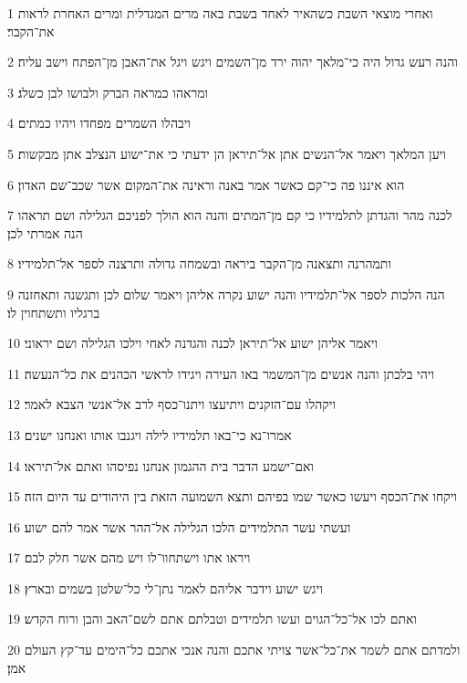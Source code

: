 \par 1 ואחרי מוצאי השבת כשהאיר לאחד בשבת באה מרים המגדלית ומרים האחרת לראות את־הקבר׃
\par 2 והנה רעש גדול היה כי־מלאך יהוה ירד מן־השמים ויגש ויגל את־האבן מן־הפתח וישב עליה׃
\par 3 ומראהו כמראה הברק ולבושו לבן כשלג׃
\par 4 ויבהלו השמרים מפחדו ויהיו כמתים׃
\par 5 ויען המלאך ויאמר אל־הנשים אתן אל־תיראן הן ידעתי כי את־ישוע הנצלב אתן מבקשות׃
\par 6 הוא איננו פה כי־קם כאשר אמר באנה וראינה את־המקום אשר שכב־שם האדון׃
\par 7 לכנה מהר והגדתן לתלמידיו כי קם מן־המתים והנה הוא הולך לפניכם הגלילה ושם תראהו הנה אמרתי לכן׃
\par 8 ותמהרנה ותצאנה מן־הקבר ביראה ובשמחה גדולה ותרצנה לספר אל־תלמידיו׃
\par 9 הנה הלכות לספר אל־תלמידיו והנה ישוע נקרה אליהן ויאמר שלום לכן ותגשנה ותאחזנה ברגליו ותשתחוין לו׃
\par 10 ויאמר אליהן ישוע אל־תיראן לכנה והגדנה לאחי וילכו הגלילה ושם יראוני׃
\par 11 ויהי בלכתן והנה אנשים מן־המשמר באו העירה ויגידו לראשי הכהנים את כל־הנעשה׃
\par 12 ויקהלו עם־הזקנים ויתיעצו ויתנו־כסף לרב אל־אנשי הצבא לאמר׃
\par 13 אמרו־נא כי־באו תלמידיו לילה ויגנבו אותו ואנחנו ישנים׃
\par 14 ואם־ישמע הדבר בית ההגמון אנחנו נפיסהו ואתם אל־תיראו׃
\par 15 ויקחו את־הכסף ויעשו כאשר שמו בפיהם ותצא השמועה הזאת בין היהודים עד היום הזה׃
\par 16 ועשתי עשר התלמידים הלכו הגלילה אל־ההר אשר אמר להם ישוע׃
\par 17 ויראו אתו וישתחוו־לו ויש מהם אשר חלק לבם׃
\par 18 ויגש ישוע וידבר אליהם לאמר נתן־לי כל־שלטן בשמים ובארץ׃
\par 19 ואתם לכו אל־כל־הגוים ועשו תלמידים וטבלתם אתם לשם־האב והבן ורוח הקדש׃
\par 20 ולמדתם אתם לשמר את־כל־אשר צויתי אתכם והנה אנכי אתכם כל־הימים עד־קץ העולם אמן׃


